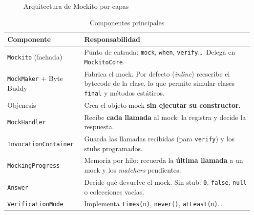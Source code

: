 \documentclass[11pt,a4paper,oneside]{report}
\newcommand{\code}[1]{\texttt{#1}}
\begin{document}
\begin{figure}[H]
\caption{Arquitectura de Mockito por capas}
\label{fig:capas}
\end{figure}

\begin{table}[H]
\centering
\caption{Componentes principales}
\small
\begin{tabularx}{\linewidth}{lX}
\toprule
\textbf{Componente} & \textbf{Responsabilidad}\\
\midrule
\code{Mockito} (fachada) & Punto de entrada: \code{mock}, \code{when}, \code{verify}\ldots\ Delega en \code{MockitoCore}.\\
\code{MockMaker} + Byte Buddy & Fabrica el mock. Por defecto (\emph{inline}) reescribe el bytecode de la clase, lo que permite simular clases \code{final} y métodos estáticos.\\
Objenesis & Crea el objeto mock \textbf{sin ejecutar su constructor}.\\
\code{MockHandler} & Recibe \textbf{cada llamada} al mock: la registra y decide la respuesta.\\
\code{InvocationContainer} & Guarda las llamadas recibidas (para \code{verify}) y los stubs programados.\\
\code{MockingProgress} & Memoria por hilo: recuerda la \textbf{última llamada} a un mock y los \emph{matchers} pendientes.\\
\code{Answer} & Decide qué devuelve el mock. Sin stub: \code{0}, \code{false}, \code{null} o colecciones vacías.\\
\code{VerificationMode} & Implementa \code{times(n)}, \code{never()}, \code{atLeast(n)}\ldots\\
\bottomrule
\end{tabularx}
\end{table}
\end{document}
